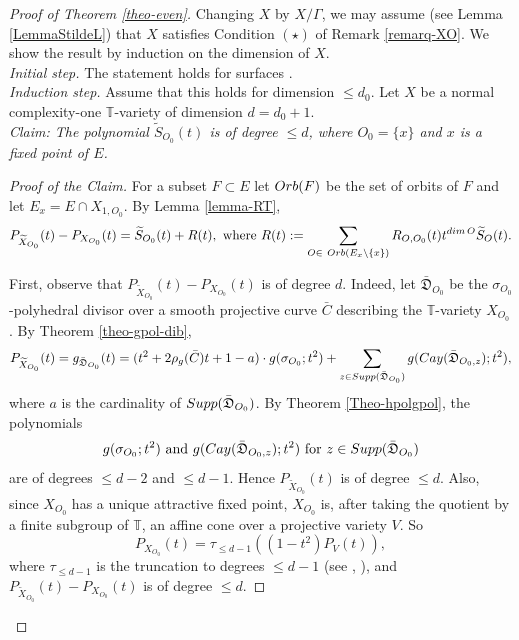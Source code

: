 \documentclass[11pt, reqno]{amsart}
\theoremstyle{plain}
\theoremstyle{definition}
\theoremstyle{remark}
\begin{document}
\begin{proof}[Proof of Theorem \ref{theo-even}] 

Changing $X$ by $X/\Gamma$,  we may assume (see Lemma \ref{LemmaStildeL}) that $X$ satisfies Condition $(\star)$ of Remark \ref{remarq-XO}. We show the result by induction on the dimension of $X$.
\\

\emph{Initial step.} The statement holds for surfaces \cite[Example 5.3]{AL21}.
\\

\emph{Induction step.} Assume that this holds for dimension $\leq d_{0}$. Let $X$ be a normal complexity-one $\mathbb{T}$-variety of dimension $d =  d_{0}+1$.
\\


\emph{Claim: The polynomial $\widetilde{S}_{O_{0}}(t)$ is of degree $\leq d$, where $O_{0} =  \{x\}$ and $x$ is a fixed point of  $E$.}
\begin{proof}[Proof of the Claim]
For a subset $F\subset E$ let ${\rm Orb}(F)$ be the set of orbits
of $F$ and let $E_{x} =  E\cap X_{1, O_{0}}$.
By Lemma \ref{lemma-RT}, 
$$P_{\widetilde{X}_{O_{0}}}(t) -  P_{X_{O_{0}}}(t)  =  \widetilde{S}_{O_{0}}(t) + R(t), \text{ where }
R(t) := \sum_{O\in\ {\rm Orb}(E_{x}\setminus\{x\})}R_{O, O_{0}}(t)t^{{\rm dim}\, O} \widetilde{S}_{O}(t).$$

First,  observe that $P_{\widetilde{X}_{O_{0}}}(t) -  P_{X_{O_{0}}}(t)$ is of degree $d$. Indeed, let $\bar{\mathfrak{D}}_{O_{0}}$ be the $\sigma_{O_{0}}$-polyhedral divisor over a smooth projective curve $\bar{C}$ describing the $\mathbb{T}$-variety $X_{O_{0}}$. By Theorem \ref{theo-gpol-dib},
$$P_{\widetilde{X}_{O_{0}}}(t)  =  g_{\bar{\mathfrak{D}}_{O_{0}}}(t) =  (t^{2} + 2\rho_{g}(\bar{C})t + 1-a)\cdot g(\sigma_{O_{0}}; t^{2}) +  \sum_{z\in{\rm Supp}(\bar{\mathfrak{D}}_{O_{0}})}
g({\rm Cay}(\bar{\mathfrak{D}}_{O_{0}, z}); t^{2}),$$
where $a$ is the cardinality of ${\rm Supp}(\bar{\mathfrak{D}}_{O_{0}})$. By Theorem \ref{Theo-hpolgpol}, the polynomials $$g(\sigma_{O_{0}}; t^{2})\text{ and }g({\rm Cay}(\bar{\mathfrak{D}}_{O_{0}, z}); t^{2})\text{ for }z\in  {\rm Supp}(\bar{\mathfrak{D}}_{O_{0}})$$ are of degrees $\leq d-2$ and $\leq d-1$. Hence 
$P_{\widetilde{X}_{O_{0}}}(t) $ is of degree $\leq d$. Also, since $X_{O_{0}}$
has a unique attractive fixed point, $X_{O_{0}}$
is, after taking the quotient by a finite subgroup of $\mathbb{T}$,  an affine cone over a projective variety $V$. So
$$P_{X_{O_{0}}}(t)  =  \tau_{\leq d-1}((1-t^{2})P_{V}(t)),$$
where $\tau_{\leq d-1}$ is the truncation to degrees $\leq d-1$ (see \cite[Lemma 2.1]{Fie91}, \cite[Proposition 5.6]{AL21}), and $P_{\widetilde{X}_{O_{0}}}(t) -  P_{X_{O_{0}}}(t)  $ is of degree $\leq d$.


\end{proof}
\end{proof}
\end{document}
